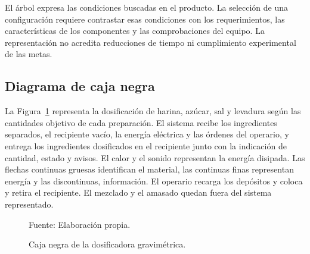 El árbol expresa las condiciones buscadas en el producto. La selección
de una configuración requiere contrastar esas condiciones con los
requerimientos, las características de los componentes y las
comprobaciones del equipo. La representación no acredita reducciones
de tiempo ni cumplimiento experimental de las metas.

\subsection{Diagrama de caja negra}

La Figura~\ref{fig:caja_negra_dosificadora} representa la dosificación
de harina, azúcar, sal y levadura según las cantidades objetivo de cada
preparación. El sistema recibe los ingredientes separados, el recipiente
vacío, la energía eléctrica y las órdenes del operario, y entrega los
ingredientes dosificados en el recipiente junto con la indicación de
cantidad, estado y avisos. El calor y el sonido representan la energía
disipada. Las flechas continuas gruesas identifican el material, las
continuas finas representan energía y las discontinuas, información.
El operario recarga los depósitos y coloca y retira el recipiente.
El mezclado y el amasado quedan fuera del sistema representado.

\begin{figure}[H]
    \centering
    \caption{Caja negra de la dosificadora gravimétrica.}
    \label{fig:caja_negra_dosificadora}
    {\footnotesize Fuente: Elaboración propia.}
\end{figure}

